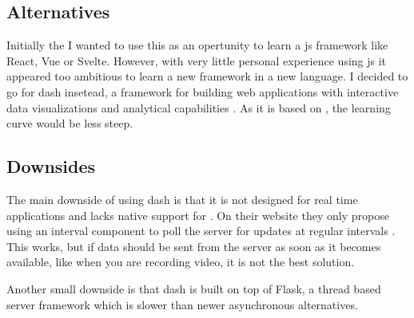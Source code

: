 \subsection{Alternatives}
Initially the I wanted to use this as an opertunity to learn a \gls{js} framework like React, Vue or Svelte.
However, with very little personal experience using \gls{js} it appeared too ambitious to learn a new framework in a new language.
I decided to go for \gls{dash} insetead, a \py framework for building web applications with interactive data visualizations and analytical capabilities \cite{plotlyPlotlyLowCodeData}.
As it is based on \py, the learning curve would be less steep.

\subsection{Downsides}
The main downside of using \gls{dash} is that it is not designed for real time applications and lacks native support for .
On their website they only propose using an interval component to poll the server for updates at regular intervals  \cite{plotlyLiveUpdatesDasha}.
This works, but if data should be sent from the server as soon as it becomes available, like when you are recording video, it is not the best solution.

Another small downside is that \gls{dash} is built on top of Flask, a thread based server framework which is slower than newer asynchronous alternatives.

